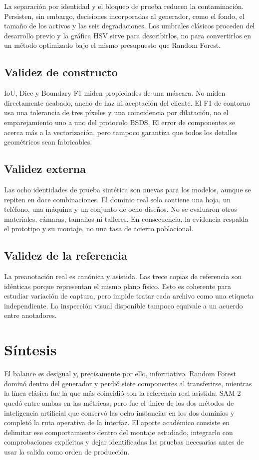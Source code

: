 La separación por identidad y el bloqueo de prueba reducen la contaminación. Persisten, sin embargo, decisiones incorporadas al generador, como el fondo, el tamaño de los activos y las seis degradaciones. Los umbrales clásicos proceden del desarrollo previo y la gráfica HSV sirve para describirlos, no para convertirlos en un método optimizado bajo el mismo presupuesto que Random Forest.

\subsection{Validez de constructo}

IoU, Dice y Boundary F1 miden propiedades de una máscara. No miden directamente acabado, ancho de haz ni aceptación del cliente. El F1 de contorno usa una tolerancia de tres píxeles y una coincidencia por dilatación, no el emparejamiento uno a uno del protocolo BSDS. El error de componentes se acerca más a la vectorización, pero tampoco garantiza que todos los detalles geométricos sean fabricables.

\subsection{Validez externa}

Las ocho identidades de prueba sintética son nuevas para los modelos, aunque se repiten en doce combinaciones. El dominio real solo contiene una hoja, un teléfono, una máquina y un conjunto de ocho diseños. No se evaluaron otros materiales, cámaras, tamaños ni talleres. En consecuencia, la evidencia respalda el prototipo y su montaje, no una tasa de acierto poblacional.

\subsection{Validez de la referencia}

La preanotación real es canónica y asistida. Las trece copias de referencia son idénticas porque representan el mismo plano físico. Esto es coherente para estudiar variación de captura, pero impide tratar cada archivo como una etiqueta independiente. La inspección visual disponible tampoco equivale a un acuerdo entre anotadores.

\section{Síntesis}

El balance es desigual y, precisamente por ello, informativo. Random Forest dominó dentro del generador y perdió siete componentes al transferirse, mientras la línea clásica fue la que más coincidió con la referencia real asistida. SAM 2 quedó entre ambas en las métricas, pero fue el único de los dos métodos de inteligencia artificial que conservó las ocho instancias en los dos dominios y completó la ruta operativa de la interfaz. El aporte académico consiste en delimitar ese comportamiento dentro del montaje estudiado, integrarlo con comprobaciones explícitas y dejar identificadas las pruebas necesarias antes de usar la salida como orden de producción.
